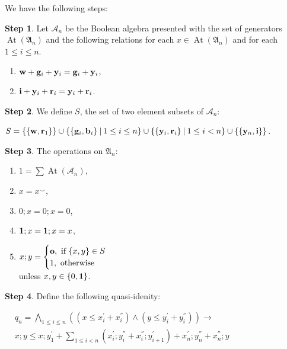 \documentclass[a4paper]{article}
\theoremstyle{defin}
\theoremstyle{theorem}
\theoremstyle{prop}
\theoremstyle{lemma}
\theoremstyle{ex}
\theoremstyle{col}
\theoremstyle{claim}
\begin{document}
We have the following steps:

\vspace{\baselineskip}

{\bf Step 1}. Let $\mathcal{A}_n$ be the Boolean algebra presented with the set of generators $\operatorname{At}(\mathfrak{A}_n)$ and the following relations for each $x \in \operatorname{At}(\mathfrak{A}_n)$ and for each $1 \leq i \leq n$.
\begin{enumerate}
  \item ${\bf w} + {\bf g}_i + {\bf y}_i = {\bf g}_i + {\bf y}_i$,
  \item ${\bf i} + {\bf y}_i + {\bf r}_i = {\bf y}_i + {\bf r}_i$.
\end{enumerate}

{\bf Step 2}. We define $S$, the set of two element subsets of $\mathcal{A}_n$:
\begin{center}
  $S = \{ \{ {\bf w}, {\bf r}_1 \} \} \cup \{ \{ {\bf g}_i, {\bf b}_i \} \: | \: 1 \leq i \leq n \} \cup
  \{ \{ {\bf y}_i, {\bf r}_i \} \: | \: 1 \leq i < n \} \cup \{ \{ {\bf y}_n, {\bf i}\} \}$.
\end{center}

{\bf Step 3}. The operations on $\mathfrak{A}_n$:
\begin{enumerate}
  \item $1 = \sum \operatorname{At}(\mathcal{A}_n)$,
  \item $x = x^{\smile}$,
  \item $0 ; x = 0 ; x = 0$,
  \item ${\bf 1} ; x = {\bf 1} ; x = x$,
  \item $x ; y = \begin{cases} {\bf o}, \text{ if $\{x, y\} \in S$} \\ 1, \text{ otherwise } \end{cases}$ \\ unless $x, y \in \{ 0, {\bf 1}\}$.
\end{enumerate}

{\bf Step 4}. Define the following quasi-idenity:
\begin{center}
  $\begin{array}{lll}
  & q_n = \bigwedge \limits_{1 \leq i \leq n} ( (x \leq x^{'}_i + x^{''}_i) \land (y \leq y^{'}_i + y^{''}_i)) \to & \\
  & x ; y \leq x ; y^{'}_1 + \sum \limits_{1 \leq i < n} (x^{'}_i ; y^{''}_i + x^{''}_i ; y^{'}_{i + 1}) + x^{'}_n ; y^{''}_n + x^{''}_n ; y&
  \end{array}$
\end{center}
\end{document}
